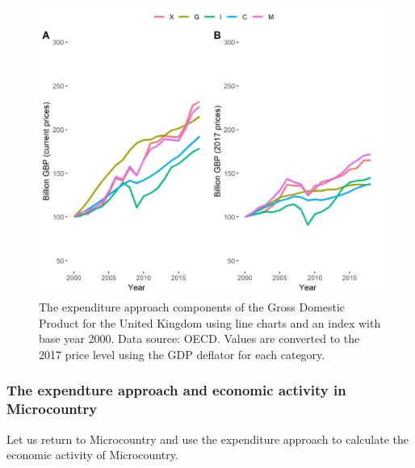 \documentclass[]{book}
\begin{document}
\begin{figure}

{\centering \includegraphics[width=0.8\linewidth]{_resources/chapter_gdp/fig3} 

}

\caption{The expenditure approach components of the Gross Domestic Product for the United Kingdom using line charts and an index with base year 2000. Data source: OECD. Values are converted to the 2017 price level using the GDP deflator for each category.}\label{fig:gdp5}
\end{figure}

\hypertarget{the-expendture-approach-and-economic-activity-in-microcountry}{%
\subsubsection{The expendture approach and economic activity in Microcountry}\label{the-expendture-approach-and-economic-activity-in-microcountry}}

Let us return to Microcountry and use the expenditure approach to calculate the economic activity of Microcountry.
\end{document}
